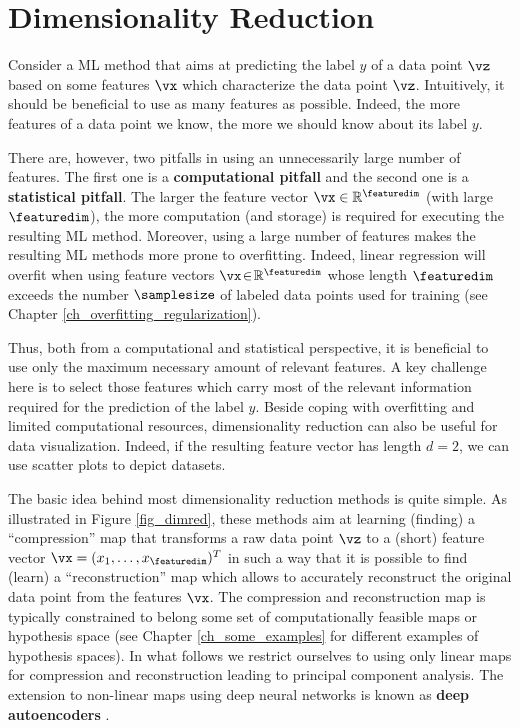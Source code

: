 \documentclass[12pt]{report}
\begin{document}
\section{Dimensionality Reduction} 
\label{sec_dim_red}

Consider a ML method that aims at predicting the label $y$  of a data point $\vz$ 
based on some features $\vx$ which characterize the data point $\vz$. Intuitively, it 
should be beneficial to use as many features as possible. Indeed, the more features 
of a data point we know, the more we should know about its label $y$. 

There are, however, two pitfalls in using an unnecessarily large number of features. 
The first one is a {\bf computational pitfall} and the second one is a {\bf statistical pitfall}. 
The larger the feature vector $\vx \in \mathbb{R}^{\featuredim}$ (with large $\featuredim$), 
the more computation (and storage) is required for executing the resulting ML method. 
Moreover, using a large number of features makes the resulting ML methods more prone to 
overfitting. Indeed, linear regression will overfit when using feature vectors $\vx\!\in\!\mathbb{R}^{\featuredim}$ 
whose length $\featuredim$ exceeds the number $\samplesize$ of labeled data points used 
for training (see Chapter \ref{ch_overfitting_regularization}). 

Thus, both from a computational and statistical perspective, it is beneficial to use 
only the maximum necessary amount of relevant features. A key challenge here is 
to select those features which carry most of the relevant information required for 
the prediction of the label $y$. Beside coping with overfitting and limited computational 
resources, dimensionality reduction can also be useful for data visualization. Indeed, if 
the resulting feature vector has length $d=2$, we can use scatter plots to depict datasets. 

The basic idea behind most dimensionality reduction methods is quite simple. As 
illustrated in Figure \ref{fig_dimred}, these methods aim at learning (finding) a ``compression'' 
map that transforms a raw data point $\vz$ to a (short) feature vector $\vx=(x_{1},\ldots,x_{\featuredim})^{T}$ 
in such a way that it is possible to find (learn) a ``reconstruction'' map which allows to accurately 
reconstruct the original data point from the features $\vx$. The compression and reconstruction 
map is typically constrained to belong some set of computationally feasible maps or hypothesis 
space (see Chapter \ref{ch_some_examples} for different examples of hypothesis spaces). In what 
follows we restrict ourselves to using only linear maps for compression and reconstruction leading 
to principal component analysis. The extension to non-linear maps using deep neural networks 
is known as {\bf deep autoencoders} \cite[Ch. 14]{Goodfellow-et-al-2016}. 
\end{document}
